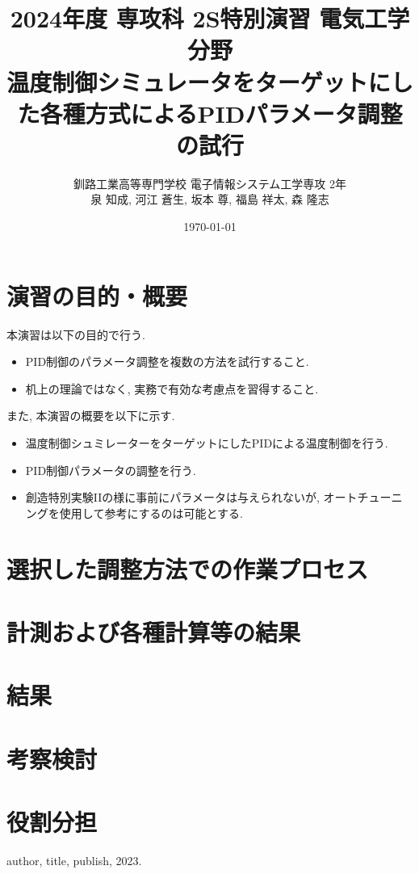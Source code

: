\documentclass[a4j, titlepage]{jarticle}
\title{2024年度 専攻科 2S特別演習 電気工学分野\\温度制御シミュレータをターゲットにした各種方式によるPIDパラメータ調整の試行}
\author{釧路工業高等専門学校 電子情報システム工学専攻 2年\\泉 知成, 河江 蒼生, 坂本 尊, 福島 祥太, 森 隆志}
\date{\today}
\begin{document}
\maketitle
\tableofcontents
\clearpage
\section{演習の目的・概要}
本演習は以下の目的で行う. 
\begin{itemize}
    \item PID制御のパラメータ調整を複数の方法を試行すること.
    \item 机上の理論ではなく, 実務で有効な考慮点を習得すること.
\end{itemize}

また, 本演習の概要を以下に示す.
\begin{itemize}
    \item 温度制御シュミレーターをターゲットにしたPIDによる温度制御を行う.
    \item PID制御パラメータの調整を行う.
    \item 創造特別実験IIの様に事前にパラメータは与えられないが, オートチューニングを使用して参考にするのは可能とする. 
\end{itemize}
\section{選択した調整方法での作業プロセス}
\section{計測および各種計算等の結果}
\section{結果}
\section{考察検討}
\section{役割分担}

\begin{thebibliography}{9}
   author, title, publish, 2023.
\end{thebibliography}
\end{document}
